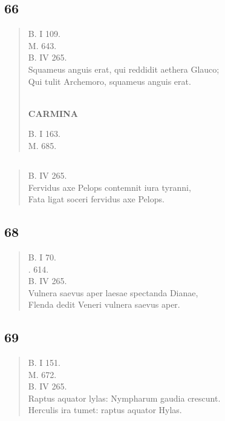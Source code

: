 \documentclass[11pt, a4paper]{report}
\begin{document}
            \subsection*{66}
      \begin{verse}
      B. I 109. \\ M. 643. \\ B. IV 265. \\ Squameus anguis erat, qui reddidit aethera Glauco; \\ Qui tulit Archemoro, squameus anguis erat. \\ 
        ﻿\pagebreak 
     \marginpar{[108]} \begin{center} \textbf{CARMINA} \end{center}B. I 163. \\ M. 685. \\ 
      \end{verse}
  
            \subsection*{}
      \begin{verse}
      B. IV 265. \\ Fervidus axe Pelops contemnit iura tyranni, \\ Fata ligat soceri fervidus axe Pelops. \\ 
      \end{verse}
  
            \subsection*{68}
      \begin{verse}
      B. I 70. \\ . 614. \\ B. IV 265. \\ Vulnera saevus aper laesae spectanda Dianae, \\ Flenda dedit Veneri vulnera saevus aper. \\ 
      \end{verse}
  
            \subsection*{69}
      \begin{verse}
      B. I 151. \\ M. 672. \\ B. IV 265. \\ Raptus aquator lylas: Nympharum gaudia crescunt. \\ Herculis ira tumet: raptus aquator Hylas. \\ 
      \end{verse}
  
\end{document}
